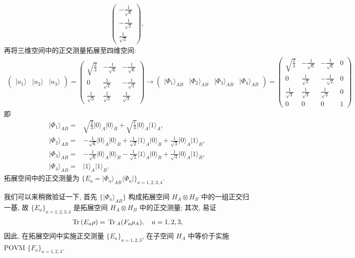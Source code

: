 \documentclass{assignment}
\begin{document}
\begin{sol}
\begin{align}
\begin{pmatrix}
            -\frac{1}{\sqrt{6}}\\
            -\frac{1}{\sqrt{2}}\\
            \frac{1}{\sqrt{3}}
        \end{pmatrix},
    \end{align}
    再将三维空间中的正交测量拓展至四维空间:
    \begin{align}
        \begin{pmatrix}
            \lvert u_1\rangle&\lvert u_2\rangle&\lvert u_3\rangle
        \end{pmatrix}=\begin{pmatrix}
            \sqrt{\frac{2}{3}}&-\frac{1}{\sqrt{6}}&-\frac{1}{\sqrt{6}}\\
            0&\frac{1}{\sqrt{2}}&-\frac{1}{\sqrt{2}}\\
            \frac{1}{\sqrt{3}}&\frac{1}{\sqrt{3}}&\frac{1}{\sqrt{3}}
        \end{pmatrix}\longrightarrow\begin{pmatrix}
            \lvert\Phi_1\rangle_{AB}&\lvert\Phi_2\rangle_{AB}&\lvert\Phi_3\rangle_{AB}&\lvert\Phi_4\rangle_{AB}
        \end{pmatrix}=\begin{pmatrix}
            \sqrt{\frac{2}{3}}&-\frac{1}{\sqrt{6}}&-\frac{1}{\sqrt{6}}&0\\
            0&\frac{1}{\sqrt{2}}&-\frac{1}{\sqrt{2}}&0\\
            \frac{1}{\sqrt{3}}&\frac{1}{\sqrt{3}}&\frac{1}{\sqrt{3}}&0\\
            0&0&0&1
        \end{pmatrix}
    \end{align}
    即
    \begin{align}
        \lvert\Phi_1\rangle_{AB}=&\sqrt{\frac{2}{3}}\lvert 0\rangle_A\lvert 0\rangle_B+\sqrt{\frac{1}{3}}\lvert 0\rangle_A\lvert 1\rangle_A,\\
        \lvert\Phi_2\rangle_{AB}=&-\frac{1}{\sqrt{6}}\lvert 0\rangle_A\lvert 0\rangle_B+\frac{1}{\sqrt{2}}\lvert 1\rangle_A\lvert 0\rangle_B+\frac{1}{\sqrt{3}}\lvert 0\rangle_A\lvert 1\rangle_B,\\
        \lvert\Phi_3\rangle_{AB}=&-\frac{1}{\sqrt{6}}\lvert 0\rangle_A\lvert 0\rangle_B-\frac{1}{\sqrt{2}}\lvert 1\rangle_A\lvert 0\rangle_B+\frac{1}{\sqrt{3}}\lvert 0\rangle_A\lvert 1\rangle_B,\\
        \lvert\Phi_4\rangle_{AB}=&\lvert 1\rangle_A\lvert 1\rangle_B.
    \end{align}
    拓展空间中的正交测量为 $\{E_a=\lvert\Phi_a\rangle_{AB}\langle\Phi_a\rvert\}_{a=1,2,3,4}$.

    我们可以来稍微验证一下, 首先 $\{\lvert\Phi_a\rangle_{AB}\}$ 构成拓展空间 $H_A\otimes H_B$ 中的一组正交归一基, 故 $\{E_a\}_{a=1,2,3,4}$ 是拓展空间 $H_A\otimes H_B$ 中的正交测量; 其次, 易证
    \begin{align}
        \,\mathrm{Tr}\,(E_a\rho)=\,\mathrm{Tr}\,_A(F_a\rho_A),\quad a=1,2,3,
    \end{align}
    因此, 在拓展空间中实施正交测量 $\{E_a\}_{a=1,2,3}$, 在子空间 $H_A$ 中等价于实施 POVM $\{F_a\}_{a=1,2,3}$.
\end{sol}
\end{document}
